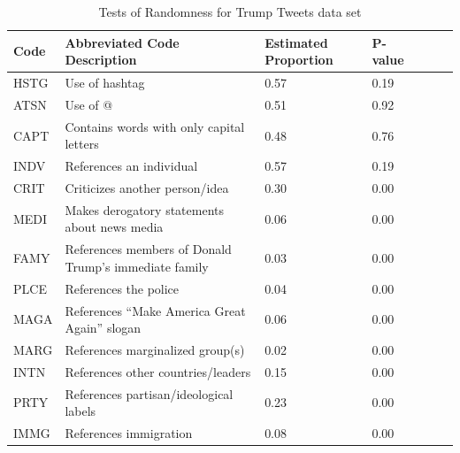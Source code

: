 \documentclass{article}
\begin{document}
\begin{table}[H]
\caption{Tests of Randomness for Trump Tweets data set}
\vspace*{2.5mm}
\begin{tabular}{@{}p{2cm}p{8cm}C{2cm}C{2cm}lcc@{}}
\toprule
\textbf{Code} & \textbf{Abbreviated Code Description} & \textbf{Estimated Proportion} & \textbf{P-value} \\ \midrule
HSTG     & Use of hashtag                     & 0.57           & 0.19             \\[1mm] 
ATSN     & Use of @                           & 0.51           & 0.92             \\[1mm] 
CAPT     & Contains words with only capital letters             & 0.48           & 0.76             \\[1mm] 
INDV     & References an individual           & 0.57           & 0.19             \\[1mm] 
CRIT     & Criticizes another person/idea    & 0.30           & 0.00             \\[1mm] 
MEDI     & Makes derogatory statements about news media  & 0.06           & 0.00             \\[1mm] 
FAMY     & References members of Donald Trump's immediate family  & 0.03           & 0.00             \\[1mm] 
PLCE     & References the police              & 0.04           & 0.00             \\[1mm] 
MAGA     & References “Make America Great Again” slogan & 0.06           & 0.00             \\[1mm] 
MARG     & References marginalized group(s)   & 0.02           & 0.00             \\[1mm] 
INTN     & References other countries/leaders & 0.15           & 0.00             \\[1mm] 
PRTY     & References partisan/ideological labels  & 0.23           & 0.00             \\[1mm] 
IMMG     & References immigration             & 0.08           & 0.00             \\ \bottomrule
\end{tabular}
\label{tab:tab2}
\end{table}
\end{document}
